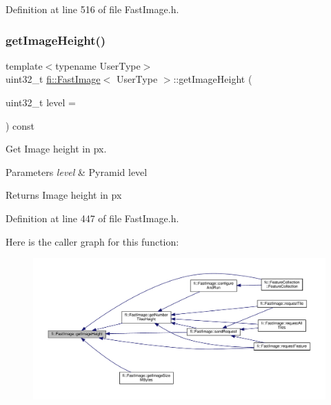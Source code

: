 Definition at line 516 of file Fast\+Image.\+h.

\mbox{\label{classfi_1_1FastImage_a355d2e82840f50ccafe0ee681f9aa70f}} 
\subsubsection{\texorpdfstring{get\+Image\+Height()}{getImageHeight()}}
{\footnotesize\ttfamily template$<$typename User\+Type$>$ \\
uint32\+\_\+t \hyperlink{classfi_1_1FastImage}{fi\+::\+Fast\+Image}$<$ User\+Type $>$\+::get\+Image\+Height (\begin{DoxyParamCaption}\item[{uint32\+\_\+t}]{level = {} }\end{DoxyParamCaption}) const\hspace{0.3cm}{\ttfamily [inline]}}



Get Image height in px. 


\begin{DoxyParams}{Parameters}
{\em level} & Pyramid level \\
\hline
\end{DoxyParams}
\begin{DoxyReturn}{Returns}
Image height in px 
\end{DoxyReturn}


Definition at line 447 of file Fast\+Image.\+h.

Here is the caller graph for this function\+:
\nopagebreak
\begin{figure}[H]
\begin{center}
\leavevmode
\includegraphics[width=350pt]{dc/d6b/classfi_1_1FastImage_a355d2e82840f50ccafe0ee681f9aa70f_icgraph}
\end{center}
\end{figure}
\mbox{\label{classfi_1_1FastImage_a9a2d39cfad1bbc8a1b5d573a5249cb68}} 
